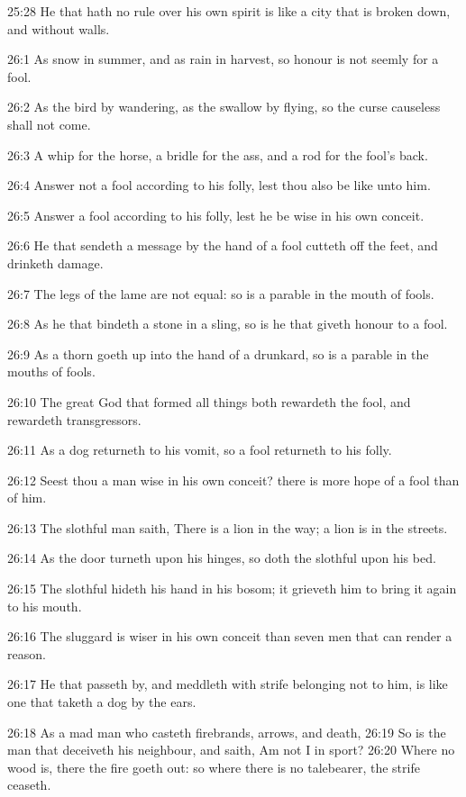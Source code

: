 25:28 He that hath no rule over his own spirit is like a city that is
broken down, and without walls.

26:1 As snow in summer, and as rain in harvest, so honour is not
seemly for a fool.

26:2 As the bird by wandering, as the swallow by flying, so the curse
causeless shall not come.

26:3 A whip for the horse, a bridle for the ass, and a rod for the
fool's back.

26:4 Answer not a fool according to his folly, lest thou also be like
unto him.

26:5 Answer a fool according to his folly, lest he be wise in his own
conceit.

26:6 He that sendeth a message by the hand of a fool cutteth off the
feet, and drinketh damage.

26:7 The legs of the lame are not equal: so is a parable in the mouth
of fools.

26:8 As he that bindeth a stone in a sling, so is he that giveth
honour to a fool.

26:9 As a thorn goeth up into the hand of a drunkard, so is a parable
in the mouths of fools.

26:10 The great God that formed all things both rewardeth the fool,
and rewardeth transgressors.

26:11 As a dog returneth to his vomit, so a fool returneth to his
folly.

26:12 Seest thou a man wise in his own conceit? there is more hope of
a fool than of him.

26:13 The slothful man saith, There is a lion in the way; a lion is in
the streets.

26:14 As the door turneth upon his hinges, so doth the slothful upon
his bed.

26:15 The slothful hideth his hand in his bosom; it grieveth him to
bring it again to his mouth.

26:16 The sluggard is wiser in his own conceit than seven men that can
render a reason.

26:17 He that passeth by, and meddleth with strife belonging not to
him, is like one that taketh a dog by the ears.

26:18 As a mad man who casteth firebrands, arrows, and death, 26:19 So
is the man that deceiveth his neighbour, and saith, Am not I in sport?
26:20 Where no wood is, there the fire goeth out: so where there is no
talebearer, the strife ceaseth.

